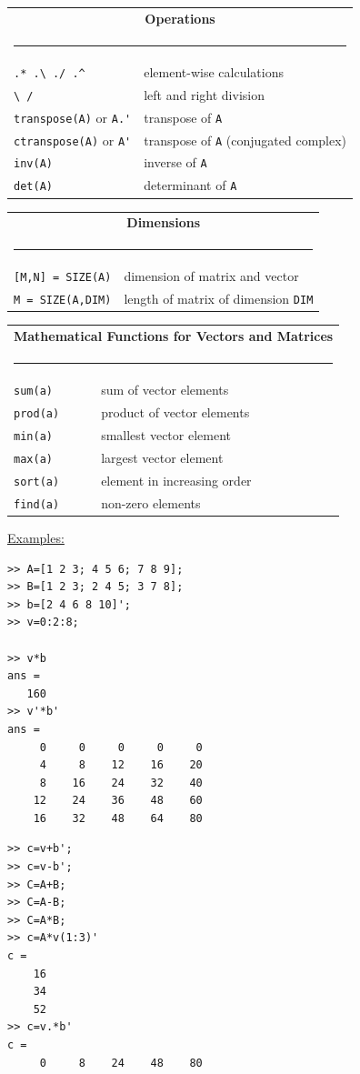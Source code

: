 \begin{tabular}{ll}
\multicolumn{2}{c}{\bf Operations}\\
\multicolumn{2}{c}{\rule{0.97\textwidth}{0pt}}\\[-2ex]\hline
\verb(.* .\ ./ .^( & element-wise calculations\\
\verb(\ /( & left and right division\\
\verb/transpose(A)/ or \verb/A.'/ & transpose of \verb/A/\\
\verb/ctranspose(A)/ or \verb/A'/ & transpose of \verb/A/ (conjugated complex)\\
\verb/inv(A)/ & inverse of \verb/A/\\
\verb/det(A)/ & determinant of \verb/A/\\
\hline
\end{tabular}

\begin{tabular}{ll}
\multicolumn{2}{c}{\bf Dimensions}\\
\multicolumn{2}{c}{\rule{0.97\textwidth}{0pt}}\\[-2ex]\hline
\verb/[M,N] = SIZE(A)/ & dimension of matrix and vector\\
\verb/M = SIZE(A,DIM)/ & length of matrix of dimension \verb/DIM/\\
\hline
\end{tabular}

\begin{tabular}{ll}
\multicolumn{2}{c}{\bf Mathematical Functions for Vectors and Matrices}\\
\multicolumn{2}{c}{\rule{0.97\textwidth}{0pt}}\\[-2ex]\hline
\verb/sum(a)/ & sum of vector elements\\
\verb/prod(a)/ & product of vector elements\\
\verb/min(a)/ & smallest vector element\\
\verb/max(a)/ & largest vector element\\
\verb/sort(a)/ & element in increasing order\\
\verb/find(a)/ & non-zero elements\\
\hline
\end{tabular}

\medskip
\underline{Examples:}\\
\begin{minipage}[t]{0.5\textwidth}
\small\begin{verbatim}
>> A=[1 2 3; 4 5 6; 7 8 9];
>> B=[1 2 3; 2 4 5; 3 7 8];
>> b=[2 4 6 8 10]';
>> v=0:2:8;

>> v*b
ans =
   160
>> v'*b'
ans =
     0     0     0     0     0
     4     8    12    16    20
     8    16    24    32    40
    12    24    36    48    60
    16    32    48    64    80
\end{verbatim}
\end{minipage}
\hfill
\begin{minipage}[t]{0.5\textwidth}
\small\begin{verbatim}
>> c=v+b';
>> c=v-b';
>> C=A+B;
>> C=A-B;
>> C=A*B;
>> c=A*v(1:3)'
c =
    16
    34
    52
>> c=v.*b'
c =
     0     8    24    48    80
\end{verbatim}
\end{minipage}


